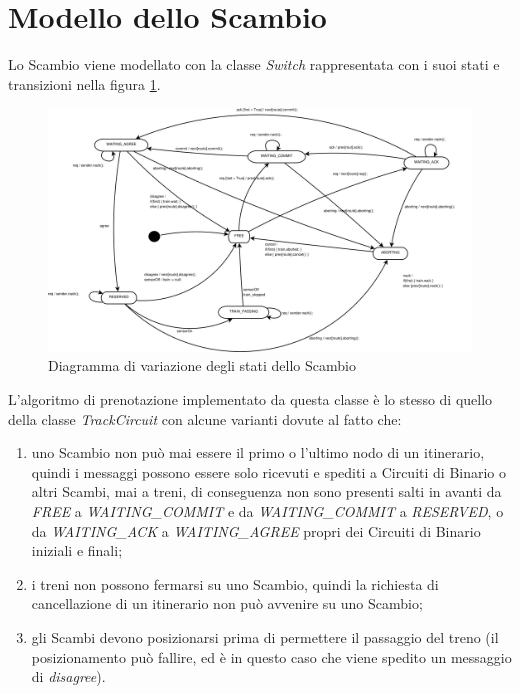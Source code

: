 \section{Modello dello Scambio}
Lo Scambio viene modellato con la classe \textit{Switch} rappresentata con i
suoi stati e transizioni nella figura \ref{fig:Scambio}.
\begin{figure}

\centering
\includegraphics[width=24cm]{imgs/TrackCircuit.pdf}

\caption{Diagramma di variazione degli stati dello Scambio}\label{fig:Scambio}

\end{figure}

L’algoritmo di prenotazione implementato da questa classe è lo stesso di quello
della classe \textit{TrackCircuit} con alcune varianti dovute al fatto che:
\begin{enumerate}
  \item uno Scambio non può mai essere il primo o l’ultimo nodo di un itinerario,
quindi i messaggi possono essere solo ricevuti e spediti a Circuiti di Binario o
altri Scambi, mai a treni, di conseguenza non sono presenti salti in avanti da
\textit{FREE} a \textit{WAITING\_COMMIT} e da \textit{WAITING\_COMMIT} a
\textit{RESERVED}, o da \textit{WAITING\_ACK} a \textit{WAITING\_AGREE} propri
dei Circuiti di Binario iniziali e finali;
\item i treni non possono fermarsi su uno Scambio, quindi la richiesta di
 cancellazione di un itinerario non può avvenire su uno Scambio;
\item gli Scambi devono posizionarsi prima di permettere il passaggio del treno
(il posizionamento può fallire, ed è in questo caso che viene spedito un messaggio
di \textit{disagree}). 
\end{enumerate}

